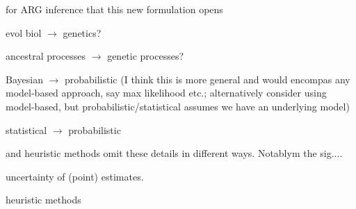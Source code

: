 
\begin{point}{\revref} %
 for ARG inference that this new formulation opens
\end{point}



\begin{point}{\revref} %
 evol biol $\to$ genetics?
\end{point}


\begin{point}{\revref} %
 ancestral processes $\to$ genetic processes?
\end{point}


\begin{point}{\revref} %
 Bayesian $\to$ probabilistic (I think this is more general and would encompas any model-based approach, say max likelihood etc.; alternatively consider using model-based, but probabilistic/statistical assumes we have an underlying model)
\end{point}


\begin{point}{\revref} %
 statistical $\to$ probabilistic
\end{point}


\begin{point}{\revref} %
 and heuristic methods omit these details in different ways. Notablym the sig....
\end{point}


\begin{point}{\revref} %
 uncertainty of (point) estimates.
\end{point}


\begin{point}{\revref} %
 heuristic methods
\end{point}

